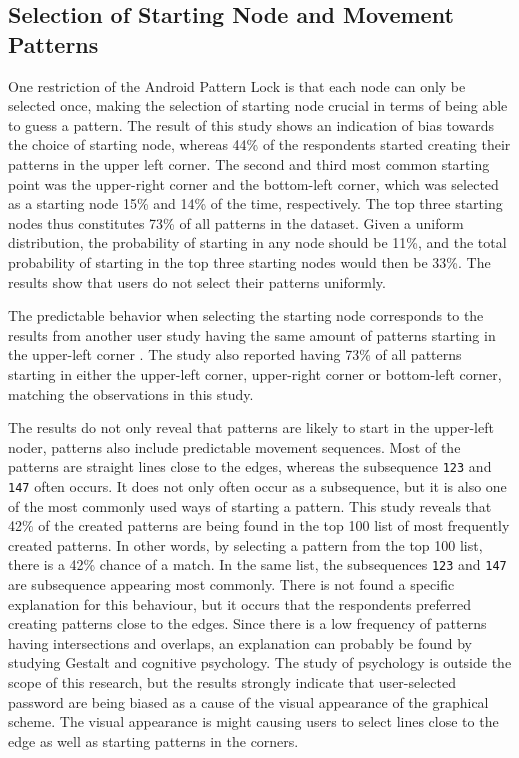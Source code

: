     \subsection{Selection of Starting Node and Movement Patterns}
      One restriction of the Android Pattern Lock is that each node can only be selected once, making the selection of starting node crucial in terms of being able to guess a pattern. The result of this study shows an indication of bias towards the choice of starting node, whereas 44\% of the respondents started creating their patterns in the upper left corner. The second and third most common starting point was the upper-right corner and the bottom-left corner, which was selected as a starting node 15\% and 14\% of the time, respectively. The top three starting nodes thus constitutes 73\% of all patterns in the dataset. Given a uniform distribution, the probability of starting in any node should be 11\%, and the total probability of starting in the top three starting nodes would then be 33\%. The results show that users do not select their patterns uniformly.

      The predictable behavior when selecting the starting node corresponds to the results from another user study having the same amount of patterns starting in the upper-left corner \cite{Uellenbeck}. The study also reported having 73\% of all patterns starting in either the upper-left corner, upper-right corner or bottom-left corner, matching the observations in this study.

      The results do not only reveal that patterns are likely to start in the upper-left noder, patterns also include predictable movement sequences. Most of the patterns are straight lines close to the edges, whereas the subsequence \texttt{123} and \texttt{147} often occurs. It does not only often occur as a subsequence, but it is also one of the most commonly used ways of starting a pattern. This study reveals that 42\% of the created patterns are being found in the top 100 list of most frequently created patterns. In other words, by selecting a pattern from the top 100 list, there is a 42\% chance of a match. In the same list, the subsequences \texttt{123} and \texttt{147} are subsequence appearing most commonly. There is not found a specific explanation for this behaviour, but it occurs that the respondents preferred creating patterns close to the edges. Since there is a low frequency of patterns having intersections and overlaps, an explanation can probably be found by studying Gestalt and cognitive psychology. The study of psychology is outside the scope of this research, but the results strongly indicate that user-selected password are being biased as a cause of the visual appearance of the graphical scheme. The visual appearance is might causing users to select lines close to the edge as well as starting patterns in the corners.

